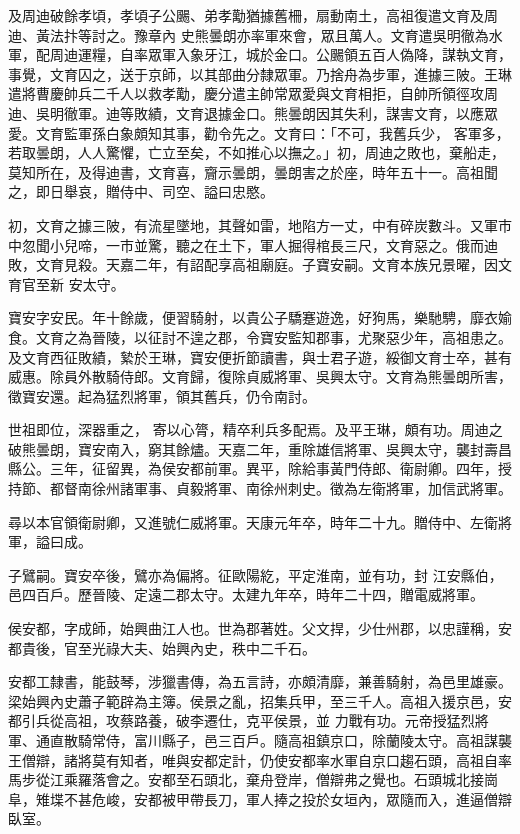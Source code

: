 \begin{pinyinscope}
 及周迪破餘孝頃，孝頃子公颺、弟孝勱猶據舊柵，扇動南土，高祖復遣文育及周迪、黃法抃等討之。豫章內
 史熊曇朗亦率軍來會，眾且萬人。文育遣吳明徹為水軍，配周迪運糧，自率眾軍入象牙江，城於金口。公颺領五百人偽降，謀執文育，事覺，文育囚之，送于京師，以其部曲分隸眾軍。乃捨舟為步軍，進據三陂。王琳遣將曹慶帥兵二千人以救孝勱，慶分遣主帥常眾愛與文育相拒，自帥所領徑攻周迪、吳明徹軍。迪等敗績，文育退據金口。熊曇朗因其失利，謀害文育，以應眾愛。文育監軍孫白象頗知其事，勸令先之。文育曰：「不可，我舊兵少，
 客軍多，若取曇朗，人人驚懼，亡立至矣，不如推心以撫之。」初，周迪之敗也，棄船走，莫知所在，及得迪書，文育喜，齎示曇朗，曇朗害之於座，時年五十一。高祖聞之，即日舉哀，贈侍中、司空、謚曰忠愍。



 初，文育之據三陂，有流星墜地，其聲如雷，地陷方一丈，中有碎炭數斗。又軍市中忽聞小兒啼，一市並驚，聽之在土下，軍人掘得棺長三尺，文育惡之。俄而迪敗，文育見殺。天嘉二年，有詔配享高祖廟庭。子寶安嗣。文育本族兄景曜，因文育官至新
 安太守。



 寶安字安民。年十餘歲，便習騎射，以貴公子驕蹇遊逸，好狗馬，樂馳騁，靡衣媮食。文育之為晉陵，以征討不遑之郡，令寶安監知郡事，尤聚惡少年，高祖患之。及文育西征敗績，縶於王琳，寶安便折節讀書，與士君子遊，綏御文育士卒，甚有威惠。除員外散騎侍郎。文育歸，復除貞威將軍、吳興太守。文育為熊曇朗所害，徵寶安還。起為猛烈將軍，領其舊兵，仍令南討。



 世祖即位，深器重之，
 寄以心膂，精卒利兵多配焉。及平王琳，頗有功。周迪之破熊曇朗，寶安南入，窮其餘燼。天嘉二年，重除雄信將軍、吳興太守，襲封壽昌縣公。三年，征留異，為侯安都前軍。異平，除給事黃門侍郎、衛尉卿。四年，授持節、都督南徐州諸軍事、貞毅將軍、南徐州刺史。徵為左衛將軍，加信武將軍。



 尋以本官領衛尉卿，又進號仁威將軍。天康元年卒，時年二十九。贈侍中、左衛將軍，謚曰成。



 子鷿嗣。寶安卒後，鷿亦為偏將。征歐陽紇，平定淮南，並有功，封
 江安縣伯，邑四百戶。歷晉陵、定遠二郡太守。太建九年卒，時年二十四，贈電威將軍。



 侯安都，字成師，始興曲江人也。世為郡著姓。父文捍，少仕州郡，以忠謹稱，安都貴後，官至光祿大夫、始興內史，秩中二千石。



 安都工隸書，能鼓琴，涉獵書傳，為五言詩，亦頗清靡，兼善騎射，為邑里雄豪。梁始興內史蕭子範辟為主簿。侯景之亂，招集兵甲，至三千人。高祖入援京邑，安都引兵從高祖，攻蔡路養，破李遷仕，克平侯景，並
 力戰有功。元帝授猛烈將軍、通直散騎常侍，富川縣子，邑三百戶。隨高祖鎮京口，除蘭陵太守。高祖謀襲王僧辯，諸將莫有知者，唯與安都定計，仍使安都率水軍自京口趨石頭，高祖自率馬步從江乘羅落會之。安都至石頭北，棄舟登岸，僧辯弗之覺也。石頭城北接崗阜，雉堞不甚危峻，安都被甲帶長刀，軍人捧之投於女垣內，眾隨而入，進逼僧辯臥室。




\end{pinyinscope}
